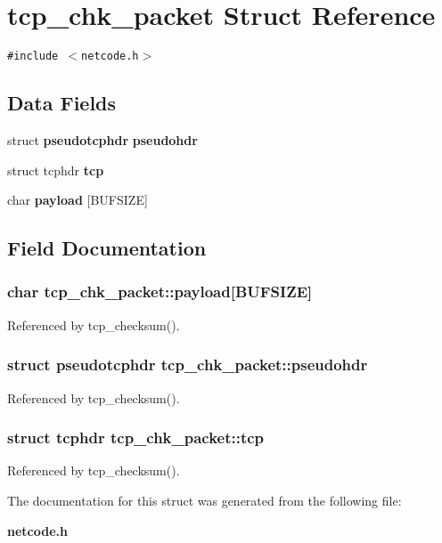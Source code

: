 \section{tcp\_\-chk\_\-packet Struct Reference}
\label{structtcp__chk__packet}
{\tt \#include $<$netcode.h$>$}

\subsection*{Data Fields}
\begin{CompactItemize}
\item 
struct {\bf pseudotcphdr} {\bf pseudohdr}
\item 
struct tcphdr {\bf tcp}
\item 
char {\bf payload} [BUFSIZE]
\end{CompactItemize}


\subsection{Field Documentation}
\subsubsection[{payload}]{\setlength{\rightskip}{0pt plus 5cm}char {\bf tcp\_\-chk\_\-packet::payload}[BUFSIZE]}\label{structtcp__chk__packet_9b2c01142662ee1eaf2d256961c49537}




Referenced by tcp\_\-checksum().
\subsubsection[{pseudohdr}]{\setlength{\rightskip}{0pt plus 5cm}struct {\bf pseudotcphdr} {\bf tcp\_\-chk\_\-packet::pseudohdr}\hspace{0.3cm}{\tt  [read]}}\label{structtcp__chk__packet_dd903e8ea0ecf5c18c4557ccd70949f9}




Referenced by tcp\_\-checksum().
\subsubsection[{tcp}]{\setlength{\rightskip}{0pt plus 5cm}struct tcphdr {\bf tcp\_\-chk\_\-packet::tcp}\hspace{0.3cm}{\tt  [read]}}\label{structtcp__chk__packet_ae38794211d236ec24260f9bedf90579}




Referenced by tcp\_\-checksum().

The documentation for this struct was generated from the following file:\begin{CompactItemize}
\item 
{\bf netcode.h}\end{CompactItemize}
